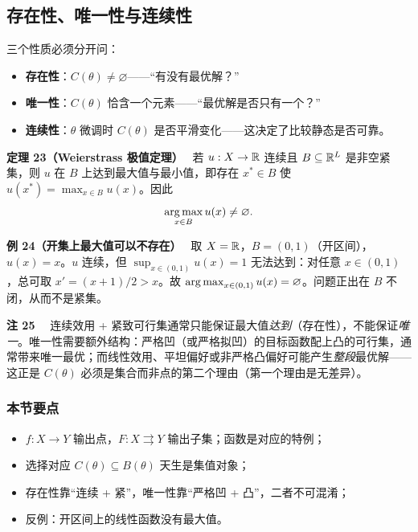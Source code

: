 \subsection{存在性、唯一性与连续性}

三个性质必须分开问：
\begin{itemize}
  \item \textbf{存在性}：$C(\theta)\neq\varnothing$——“有没有最优解？”
  \item \textbf{唯一性}：$C(\theta)$ 恰含一个元素——“最优解是否只有一个？”
  \item \textbf{连续性}：$\theta$ 微调时 $C(\theta)$ 是否平滑变化——这决定了比较静态是否可靠。
\end{itemize}



\textbf{定理 23}\textbf{（Weierstrass 极值定理）}　
若 $u:X\to\mathbb{R}$ 连续且 $B\subseteq\mathbb{R}^{L}$ 是非空紧集，则 $u$ 在 $B$ 上达到最大值与最小值，即存在 $x^{*}\in B$ 使 $u(x^{*})=\max_{x\in B}u(x)$。因此
\[
\operatorname*{arg\,max}_{x\in B}u(x)\neq\varnothing .
\]






\textbf{例 24}\textbf{（开集上最大值可以不存在）}　
取 $X=\mathbb{R}$，$B=(0,1)$（开区间），$u(x)=x$。$u$ 连续，但 $\sup_{x\in(0,1)}u(x)=1$ 无法达到：对任意 $x\in(0,1)$，总可取 $x'=(x+1)/2>x$。故 $\operatorname*{arg\,max}_{x\in(0,1)}u(x)=\varnothing$。问题正出在 $B$ 不闭，从而不是紧集。






\textbf{注 25}　
连续效用 + 紧致可行集通常只能保证最大值\emph{达到}（存在性），不能保证\emph{唯一}。唯一性需要额外结构：严格凹（或严格拟凹）的目标函数配上凸的可行集，通常带来唯一最优；而线性效用、平坦偏好或非严格凸偏好可能产生\emph{整段}最优解——这正是 $C(\theta)$ 必须是集合而非点的第二个理由（第一个理由是无差异）。






\subsubsection*{本节要点}


\begin{itemize}
  \item $f:X\to Y$ 输出点，$F:X\rightrightarrows Y$ 输出子集；函数是对应的特例；
  \item 选择对应 $C(\theta)\subseteq B(\theta)$ 天生是集值对象；
  \item 存在性靠“连续 + 紧”，唯一性靠“严格凹 + 凸”，二者不可混淆；
  \item 反例：开区间上的线性函数没有最大值。
\end{itemize}


